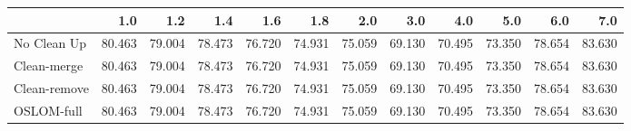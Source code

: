 \begin{tabular}{lrrrrrrrrrrr}
\toprule
{} &    1.0 &    1.2 &    1.4 &    1.6 &    1.8 &    2.0 &    3.0 &    4.0 &    5.0 &    6.0 &    7.0 \\
\midrule
No Clean Up  & 80.463 & 79.004 & 78.473 & 76.720 & 74.931 & 75.059 & 69.130 & 70.495 & 73.350 & 78.654 & 83.630 \\
Clean-merge  & 80.463 & 79.004 & 78.473 & 76.720 & 74.931 & 75.059 & 69.130 & 70.495 & 73.350 & 78.654 & 83.630 \\
Clean-remove & 80.463 & 79.004 & 78.473 & 76.720 & 74.931 & 75.059 & 69.130 & 70.495 & 73.350 & 78.654 & 83.630 \\
OSLOM-full   & 80.463 & 79.004 & 78.473 & 76.720 & 74.931 & 75.059 & 69.130 & 70.495 & 73.350 & 78.654 & 83.630 \\
\bottomrule
\end{tabular}
